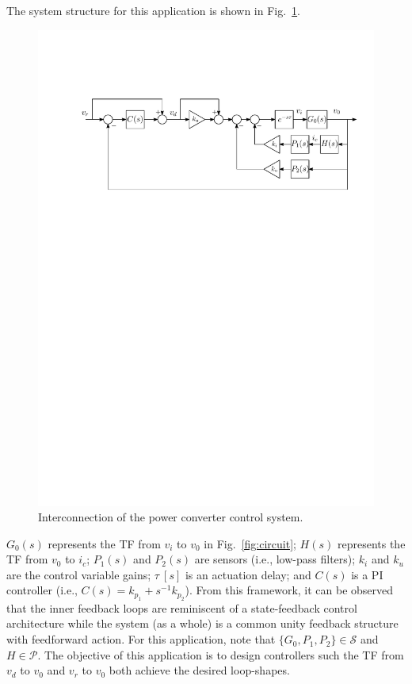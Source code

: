 \documentclass[a4paper, 10pt, conference]{ieeeconf}
\begin{document}
The system structure for this application is shown in Fig.~\ref{fig:damping_loop}. 
\begin{figure}
\centering
\includegraphics[width=\columnwidth]{../pics/damping_loop_full}
\caption{Interconnection of the power converter control system. }
\label{fig:damping_loop}
\end{figure}
$G_0(s)$ represents the TF from $v_i$ to $v_0$ in Fig.~\ref{fig:circuit}; $H(s)$ represents the TF from $v_0$ to $i_c$; $P_1(s)$ and $P_2(s)$ are sensors (i.e., low-pass filters); $k_i$ and $k_u$ are the control variable gains; $\tau \: [s]$ is an actuation delay; and $C(s)$ is a PI controller (i.e., $C(s) = k_{p_1} + s^{-1}k_{p_2}$). From this framework, it can be observed that the inner feedback loops are reminiscent of a state-feedback control architecture while the system (as a whole) is a common unity feedback structure with feedforward action. For this application, note that $\{G_0,P_1,P_2 \} \in \mathscr{S}$ and $H \in \mathscr{P}$. The objective of this application is to design controllers such the TF from $v_d$ to $v_0$ and $v_r$ to $v_0$ both achieve the desired loop-shapes.
\end{document}
